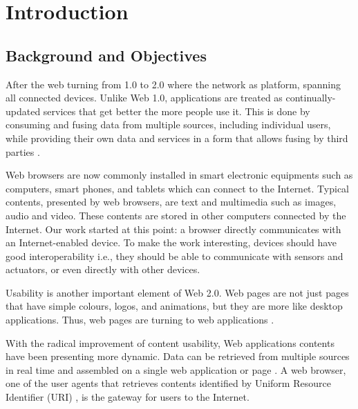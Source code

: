 \chapter{Introduction}
\label{chapter:intro}

\section{Background and Objectives}
After the web turning from 1.0 to 2.0 where the network as platform, spanning all connected devices. Unlike Web 1.0, applications are treated as continually-updated services that get better the more people use it. This is done by consuming and fusing data from multiple sources, including individual users, while providing their own data and services in a form that allows fusing by third parties \cite{o2005web}.

Web browsers are now commonly installed in smart electronic equipments such as computers, smart phones, and tablets which can connect to the Internet. Typical contents, presented by web browsers, are text and multimedia such as images, audio and video. These contents are stored in other computers connected by the Internet. Our work started at this point: a browser directly communicates with an Internet-enabled device. To make the work interesting, devices should have good interoperability i.e., they should be able to communicate with sensors and actuators, or even directly with other devices.

Usability is another important element of Web 2.0. Web pages are not just pages that have simple colours, logos, and animations, but they are more like desktop applications. Thus, web pages are turning to web applications  \cite{Lewis:2006:WEB:1217666.1217669}.

With the radical improvement of content usability, Web applications contents have been presenting more dynamic. Data can be retrieved from multiple sources in real time and assembled on a single web application or page \cite{Lewis:2006:WEB:1217666.1217669}. A web browser, one of the user agents that retrieves contents identified by Uniform Resource Identifier (URI) \cite{ArchitectWorldWideWebVolumeOne}, is the gateway for users to the Internet.

